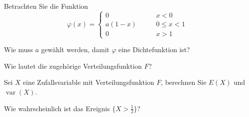 Betrachten Sie die Funktion
\[
\varphi(x)=\begin{cases}
0&\qquad x < 0 \\
a(1 - x)&\qquad 0 \le x < 1\\
0&\qquad x>1
\end{cases}
\]
\begin{teilaufgaben}
\item Wie muss $a$ gewählt werden, damit $\varphi$ eine Dichtefunktion
ist?
\item Wie lautet die zugehörige Verteilungsfunktion $F$?
\item Sei $X$ eine Zufallsvariable mit Verteilungsfunktion $F$, berechnen
Sie $E(X)$ und $\operatorname{var}(X)$.
\item Wie wahrscheinlich ist das Ereignis $\{ X > \frac12\}$?
\end{teilaufgaben}


